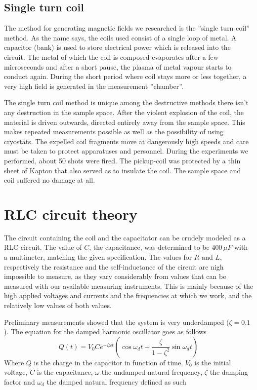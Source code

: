 \subsection{Single turn coil}

The method for generating magnetic fields we researched is the ''single turn 
coil'' method. As the name says, the coils used consist of a single loop of 
metal. A capacitor (bank) is used to store electrical power which is released 
into the circuit. The metal of which the coil is composed evaporates after a 
few microseconds and after a short pause, the plasma of metal vapour starts to 
conduct again. During the short period where coil stays more or less together, 
a very high field is generated in the measurement ''chamber''. 

The single turn coil method is unique among the destructive methods there isn't 
any destruction in the sample space. After the violent explosion of the coil, 
the material is driven outwards, directed entirely away from the sample space.  
This makes repeated measurements possible as well as the possibility of using 
cryostats. The expelled coil fragments move at dangerously high speeds and care 
must be taken to protect apparatuses and personnel. \cite{singleTurn} 
\cite{herlachArticle} During the experiments we performed, about 50 shots were 
fired. The pickup-coil was protected by a thin sheet of Kapton that also served 
as to insulate the coil. The sample space and coil suffered no damage at all.

\section{RLC circuit theory}

The circuit containing the coil and the capacitator can be crudely modeled as a 
RLC circuit. The value of $C$, the capacitance, was determined to be $400\,\mu 
F$ with a multimeter, matching the given specification. The values for $R$ and 
$L$, respectively the resistance and the self-inductance of the circuit are 
nigh impossible to measure, as they vary considerably from values that can be 
measured with our available measuring instruments. This is mainly because of 
the high applied voltages and currents and the frequencies at which we work, 
and the relatively low values of both values.

Preliminary measurements showed that the system is very underdamped ($\zeta = 
0.1$). The equation for the damped harmonic oscillator goes as follows 
\cite{serway}
$$
Q(t) = V_0 C e^{-\zeta \omega t} \left( \cos{\omega_d t} + \frac{\zeta} 
{1-\zeta^2} \sin{\omega_d t}\right)
$$
Where $Q$ is the charge in the capacitor in function of time, $V_0$ is the 
initial voltage, $C$ is the capacitance, $\omega$ the undamped natural 
frequency, $\zeta$ the damping factor and $\omega_d$ the damped natural 
frequency defined as such


